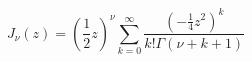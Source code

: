 \documentclass[12pt]{article}
\begin{document}
\begin{displaymath}
J_\nu(z) = \left(\frac{1}{2}z\right)^\nu \sum_{k=0}^\infty
    \frac{(-\frac{1}{4}z^2)^k}{k!\Gamma(\nu+k+1)}
\end{displaymath}
\end{document}
